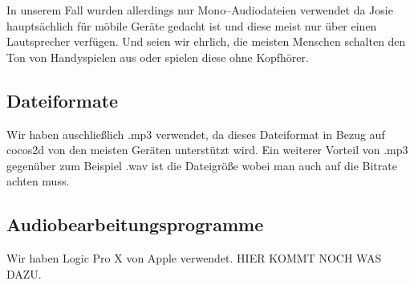 In unserem Fall wurden allerdings nur Mono--Audiodateien verwendet da Josie hauptsächlich für möbile Geräte gedacht ist und diese meist nur über einen Lautsprecher verfügen. Und seien wir ehrlich, die meisten Menschen schalten den Ton von Handyspielen aus oder spielen diese ohne Kopfhörer.


\subsection{Dateiformate}
Wir haben auschließlich .mp3 verwendet, da dieses Dateiformat in Bezug auf cocos2d von den meisten Geräten unterstützt wird. Ein weiterer Vorteil von .mp3 gegenüber zum Beispiel .wav ist die Dateigröße wobei man auch auf die Bitrate achten muss. 


\subsection{Audiobearbeitungsprogramme}
Wir haben Logic Pro X von Apple verwendet. HIER KOMMT NOCH WAS DAZU.


